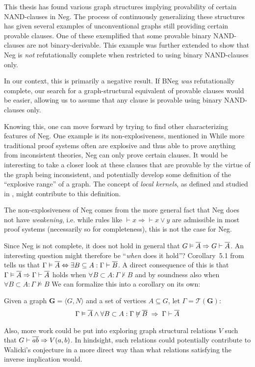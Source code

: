 This thesis has found various graph structures implying provability of certain NAND-clauses in Neg.
The process of continuously generalizing these structures has given several examples of unconventional graphs still providing certain provable clauses.
One of these exemplified that some provable binary NAND-clauses are not binary-derivable.
This example was further extended to show that Neg is \textit{not} refutationally complete when restricted to using binary NAND-clauses only.

In our context, this is primarily a negative result.
If BNeg \textit{was} refutationally complete, our search for a graph-structural equivalent of provable clauses would be easier, allowing us to assume that any clause is provable using binary NAND-clauses only.

Knowing this, one can move forward by trying to find other characterizing features of Neg.
One example is its non-explosiveness, mentioned in \cite{michal-completeness}
While more traditional proof systems often are explosive and thus able to prove anything from inconsistent theories, Neg can only prove certain clauses.
It would be interesting to take a closer look at these clauses that are provable by the virtue of the graph being inconsistent, and potentially develop some definition of the ``explosive range'' of a graph.
The concept of \textit{local kernels}, as defined and studied in \cite{synthese-pdl}, might contribute to this definition.

The non-explosiveness of Neg comes from the more general fact that Neg does not have \textit{weakening}, i.e. while rules like $\vdash x \Rightarrow \vdash x \vee y$ are admissible in most proof systems (necessarily so for completeness), this is not the case for Neg.

Since Neg is not complete, it does not hold in general that $G \vDash \ol{A} \Rightarrow G \vdash \ol{A}$.
An interesting question might therefore be ``\textit{when} does it hold''?
Corollary~5.1 from \cite{michal-completeness} tells us that $\Gamma \vDash \ol{A} \Leftrightarrow \exists B \subseteq A: \Gamma \vdash \ol{B}$.
A direct consequence of this is that $\Gamma \vDash \ol{A} \Rightarrow \Gamma \vdash \ol{A}$ holds when $\forall B \subset A: \Gamma \not\vdash B$ and by soundness also when $\forall B \subset A: \Gamma \not\vDash B$
We can formalize this into a corollary on its own:
\begin{corollary}
  Given a graph $\mathbf{G} = \langle G,N \rangle$ and a set of vertices $A \subseteq G$, let $\Gamma = \mathcal{T}(\mathbf{G})$:
  \begin{align}
    \Gamma \vDash \ol{A} \wedge \forall B \subset A: \Gamma \not\vDash \ol{ B } \;\Rightarrow \; \Gamma \vdash \ol{A}
  \end{align}
\end{corollary}

Also, more work could be put into exploring graph structural relations $V$ such that $G \vdash \ol{ab} \Rightarrow V(a,b)$.
In hindsight, such relations could potentially contribute to Walicki's conjecture in a more direct way than what relations satisfying the inverse implication would.
